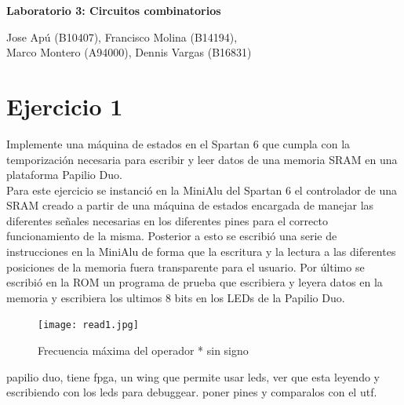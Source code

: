 \documentclass[10pt]{article}
\begin{document}
\begin{huge}
\begin{center}
\textbf{Laboratorio 3: Circuitos combinatorios}
\end{center}
\end{huge}

\begin{Large}
\begin{center}
Jose Apú (B10407), Francisco Molina (B14194), \\Marco Montero (A94000), Dennis Vargas (B16831)
\end{center}
\end{Large}


\section*{Ejercicio 1}
Implemente una máquina de estados en el Spartan 6 que cumpla con la temporización necesaria para escribir y leer datos de una memoria SRAM en una plataforma Papilio Duo.\\[0.3 cm]

Para este ejercicio se instanció en la MiniAlu del Spartan 6 el controlador de una SRAM creado a partir de una máquina de estados encargada de manejar las diferentes señales necesarias en los diferentes pines para el correcto funcionamiento de la misma. Posterior a esto se escribió una serie de instrucciones en la MiniAlu de forma que la escritura y la lectura a las diferentes posiciones de la memoria fuera transparente para el usuario. Por último se escribió en la ROM un programa de prueba que escribiera y leyera datos en la memoria y escribiera los ultimos 8 bits en los LEDs de la Papilio Duo.


\begin{figure}[hbtp]
\centering
\texttt{[image: read1.jpg]}
\caption{Frecuencia máxima del operador * sin signo}
\label{freq1}
\end{figure}




papilio duo, tiene fpga, un wing que permite usar leds, ver que esta leyendo y escribiendo con los leds para debuggear. poner pines y comparalos con el utf.
\end{document}
